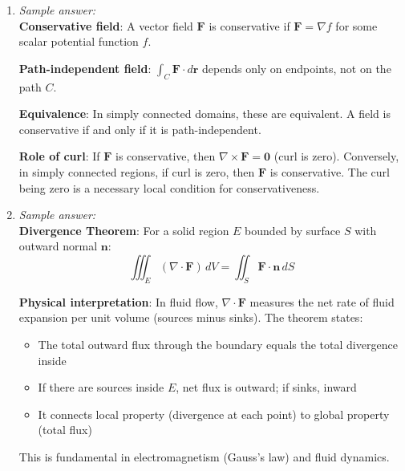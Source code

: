 \documentclass[11pt]{article}
\begin{document}
\begin{enumerate}[label=\textbf{\arabic*.}]
  \textbf{Geometric significance}: The Hessian captures the curvature of $f$ at a critical point.

  \textbf{Second derivative test}:
  \begin{itemize}
    \item If $H_f$ is positive definite (all eigenvalues positive), the critical point is a local minimum
    \item If $H_f$ is negative definite (all eigenvalues negative), it's a local maximum
    \item If $H_f$ has both positive and negative eigenvalues, it's a saddle point
    \item If $H_f$ is singular or indefinite but not clearly positive/negative, the test is inconclusive
  \end{itemize}

  \item \emph{Sample answer:}\\
  \textbf{Conservative field}: A vector field $\mathbf{F}$ is conservative if $\mathbf{F} = \nabla f$ 
  for some scalar potential function $f$.

  \textbf{Path-independent field}: $\int_C \mathbf{F} \cdot d\mathbf{r}$ depends only on endpoints, 
  not on the path $C$.

  \textbf{Equivalence}: In simply connected domains, these are equivalent. A field is conservative if 
  and only if it is path-independent.

  \textbf{Role of curl}: If $\mathbf{F}$ is conservative, then $\nabla \times \mathbf{F} = \mathbf{0}$ 
  (curl is zero). Conversely, in simply connected regions, if curl is zero, then $\mathbf{F}$ is 
  conservative. The curl being zero is a necessary local condition for conservativeness.

  \item \emph{Sample answer:}\\
  \textbf{Divergence Theorem}: For a solid region $E$ bounded by surface $S$ with outward normal $\mathbf{n}$:
  $$\iiint_E (\nabla \cdot \mathbf{F})\, dV = \iint_S \mathbf{F} \cdot \mathbf{n}\, dS$$

  \textbf{Physical interpretation}: In fluid flow, $\nabla \cdot \mathbf{F}$ measures the net rate 
  of fluid expansion per unit volume (sources minus sinks). The theorem states:
  \begin{itemize}
    \item The total outward flux through the boundary equals the total divergence inside
    \item If there are sources inside $E$, net flux is outward; if sinks, inward
    \item It connects local property (divergence at each point) to global property (total flux)
  \end{itemize}
  This is fundamental in electromagnetism (Gauss's law) and fluid dynamics.


\end{enumerate}
\end{document}
